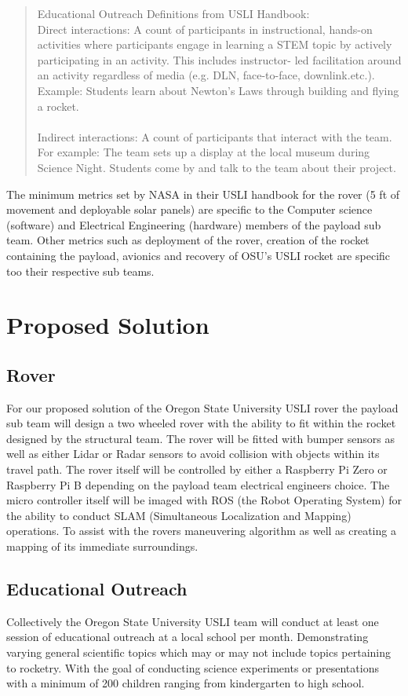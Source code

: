 \documentclass[onecolumn, draftclsnofoot,10pt, compsoc]{IEEEtran}
\begin{document}
\begin{quote}
Educational Outreach Definitions from USLI Handbook:\\
Direct interactions: A count of participants in instructional, hands-on activities where participants engage in learning a STEM topic by actively participating in an activity. This includes instructor- led facilitation around an activity regardless of media (e.g. DLN, face-to-face, downlink.etc.). Example: Students learn about Newton’s Laws through building and flying a rocket.\\ \\
Indirect interactions: A count of participants that interact with the team. For example: The team sets up a display at the local museum during Science Night. Students come by and talk to the team about their project.\\
\end{quote}\cite{USLI_handbook}
The minimum metrics set by NASA in their USLI handbook for the rover (5 ft of movement and deployable solar panels) are specific to the Computer science (software) and Electrical Engineering (hardware) members of the payload sub team. Other metrics such as deployment of the rover, creation of the rocket containing the payload, avionics and recovery of OSU's USLI rocket are specific too their respective sub teams. 

\section{Proposed Solution}
\subsection{Rover}
For our proposed solution of the Oregon State University USLI rover the payload sub team will design a two wheeled rover with the ability to fit within the rocket designed by the structural team. The rover will be fitted with bumper sensors as well as either Lidar or Radar sensors to avoid collision with objects within its travel path. The rover itself will be controlled by either a Raspberry Pi Zero or Raspberry Pi B depending on the payload team electrical engineers choice. The micro controller itself will be imaged with ROS (the Robot Operating System) for the ability to conduct SLAM (Simultaneous Localization and Mapping) operations. To assist with the rovers maneuvering algorithm as well as creating a mapping of its immediate surroundings.  
\subsection{Educational Outreach}
Collectively the Oregon State University USLI team will conduct at least one session of educational outreach at a local school per month. Demonstrating varying general scientific topics which may or may not include topics pertaining to rocketry. With the goal of conducting science experiments or presentations with a minimum of 200 children ranging from kindergarten to high school. 
\end{document}
